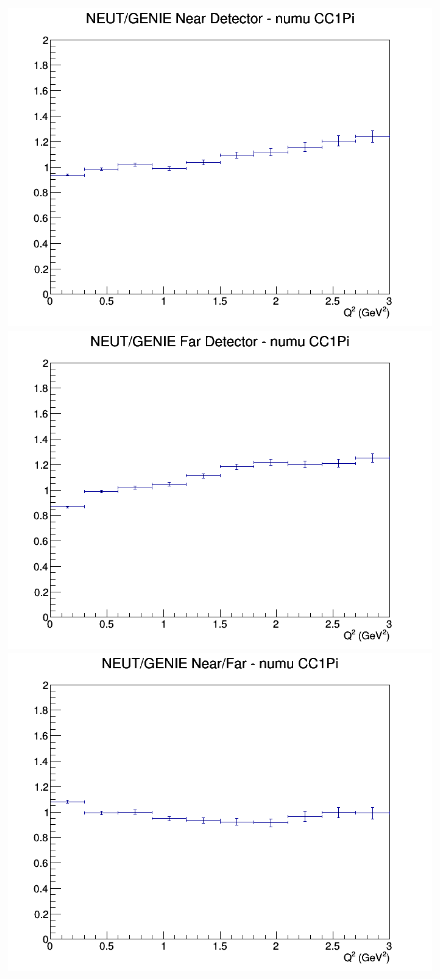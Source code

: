 \documentclass[12pt]{article}
\begin{document}
\begin{figure}[h]
\endminipage
\newline
{}
\includegraphics[width=\linewidth]{eff_Q2/FGT/ratios/CC1Pi_NEUT_GENIE_numu_near_Q2.png}
\endminipage
{}
\includegraphics[width=\linewidth]{eff_Q2/FGT/ratios/CC1Pi_NEUT_GENIE_numu_far_Q2.png}
\endminipage
{}
\includegraphics[width=\linewidth]{eff_Q2/FGT/ratios/CC1Pi_NEUT_GENIE_numu_NF_Q2.png}

\end{figure}
\end{document}
